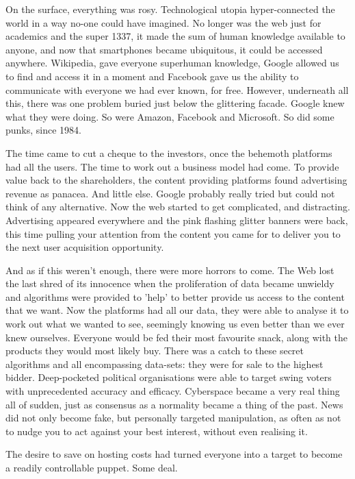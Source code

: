 On the surface, everything was rosy. Technological utopia hyper-connected the world in a way no-one could have imagined. No longer was the web just for academics and the super 1337, it made the sum of human knowledge available to anyone, and now that smartphones became ubiquitous, it could be accessed anywhere. Wikipedia, gave everyone superhuman knowledge, Google allowed us to find and access it in a moment and Facebook gave us the ability to communicate with everyone we had ever known, for free. However, underneath all this, there was one problem buried just below the glittering facade. Google knew what they were doing. So were Amazon, Facebook and Microsoft. So did some punks, since 1984.

The time came to cut a cheque to the investors, once the behemoth platforms had all the users. The time to work out a business model had come. To provide value back to the shareholders, the content providing platforms found advertising revenue as panacea. And little else. Google probably really tried but could not think of any alternative. Now the web started to get complicated, and distracting. Advertising appeared everywhere and the pink flashing glitter banners were back, this time pulling your attention from the content you came for to deliver you to the next user acquisition opportunity.

And as if this weren't enough, there were more horrors to come. The Web lost the last shred of its innocence when the proliferation of data became unwieldy and algorithms were provided to 'help' to better provide us access to the content that we want. Now the platforms had all our data, they were able to analyse it to work out what we wanted to see, seemingly knowing us even better than we ever knew ourselves. Everyone would be fed their most favourite snack, along with the products they would most likely buy. There was a catch to these secret algorithms and all encompassing data-sets: they were for sale to the highest bidder. Deep-pocketed political organisations were able to target swing voters with unprecedented accuracy and efficacy. Cyberspace became a very real thing all of sudden, just as consensus as a normality became a thing of the past. News did not only become fake, but personally targeted manipulation, as often as not to nudge you to act against your best interest, without even realising it.

The desire to save on hosting costs had turned everyone into a target to become a readily controllable puppet. Some deal.

